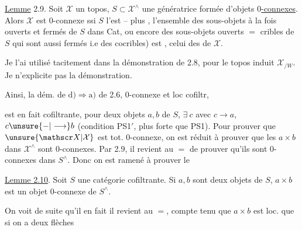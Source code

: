 \uline{Lemme} 2.9.  Soit $\mathscr X$ un topos, $S\subset\mathscr X^\wedge$ une   génératrice formée d'objets \uline{$0$-connexes}. \reversemarginpar\margin{\rule{0.4pt}{13ex}}\normalmarginpar Alors $\mathscr X$ est $0$-connexe ssi $S$ l'est -- plus  , l'ensemble  des sous-objets à la fois ouverts et fermés de $S$ dans Cat,  ou encore des   sous-objets ouverts $=$ cribles de $S$ qui sont aussi fermés i.e des cocribles) est  , celui des     de $\mathscr X$.

Je l'ai utilisé tacitement dans la démonstration de 2.8, pour le topos induit $\mathscr X_{/W}$. Je n'explicite pas la démonstration.

Ainsi,  la dém. de $\mathrm{d)}\Rightarrow\mathrm{a)}$ de 2.6,   $0$-connexe et loc cofiltr,


est en fait cofiltrante,  pour deux objets $a,b$ de $S$, $\exists\ c$ avec $c\longrightarrow a$, $c\unsure{\mathbin{-}|\longrightarrow}b$ (condition PS1$'$, plus forte que PS1). Pour prouver que $\unsure{\mathscr X|\mathcal X}$ est tot. $0$-connexe, on est réduit à prouver  que les $a\times b$ dans $\mathscr X^\wedge$ sont $0$-connexes. Par 2.9, il revient au $=$ de prouver qu'ils sont $0$-connexes dans $S^\wedge$. Donc on est ramené à prouver le

\uline{Lemme 2.10}. Soit $S$ une catégorie cofiltrante. Si $a,b$ sont deux objets de $S$, $a\times b$ est un objet $0$-connexe de $S^\wedge$.

On voit de suite qu'il   en fait il revient au $=$, compte tenu que $a\times b$ est loc.   que si on a deux flèches



